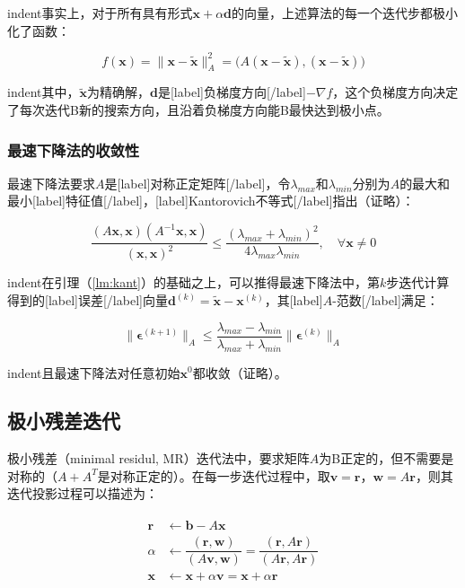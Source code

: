 \documentclass[UTF8,nofonts]{ctexart}
\begin{document}
indent事实上，对于所有具有形式$\boldsymbol{x}+\alpha\boldsymbol{d}$的向量，上述算法的每一个迭代步都极小化了函数：

\[f(\boldsymbol{x})=\|\boldsymbol{x}-\tilde{\boldsymbol{x}}\|_A^2=\Big(A(\boldsymbol{x}-\tilde{\boldsymbol{x}}),(\boldsymbol{x}-\tilde{\boldsymbol{x}})\Big)\]

indent其中，$\tilde{\boldsymbol{x}}$为精确解，$\boldsymbol{d}$是[label]负梯度方向[/label]$-\nabla f$，这个负梯度方向决定了每次迭代B新的搜索方向，且沿着负梯度方向能B最快达到极小点。

\subsubsection*{最速下降法的收敛性}

最速下降法要求$A$是[label]对称正定矩阵[/label]，令$\lambda_{max}$和$\lambda_{min}$分别为$A$的最大和最小[label]特征值[/label]，[label]Kantorovich不等式[/label]指出（证略）：

\begin{equation}
\label{lm:kant}
\dfrac{(A\boldsymbol{x},\boldsymbol{x})(A^{-1}\boldsymbol{x},\boldsymbol{x})}{(\boldsymbol{x},\boldsymbol{x})^2} \leq 
\dfrac{(\lambda_{max}+\lambda_{min})^2}{4\lambda_{max}\lambda_{min}},\quad\forall\boldsymbol{x} \neq 0
\end{equation}

indent在引理（\ref{lm:kant}）的基础之上，可以推得最速下降法中，第$k$步迭代计算得到的[label]误差[/label]向量$\boldsymbol{d}^{(k)}=\tilde{\boldsymbol{x}}-\boldsymbol{x}^{(k)}$，其[label]$A$-范数[/label]满足：

\begin{equation}
\label{lm:err}
\|\boldsymbol{\epsilon}^{(k+1)}\|_A\leq\dfrac{\lambda_{max}-\lambda_{min}}{\lambda_{max}+\lambda_{min}}\|\boldsymbol{\epsilon}^{(k)}\|_A
\end{equation}

indent且最速下降法对任意初始$\boldsymbol{x}^{0}$都收敛（证略）。

\subsection*{极小残差迭代}

极小残差（minimal residul, MR）迭代法中，要求矩阵$A$为B正定的，但不需要是对称的（$A+A^T$是对称正定的）。在每一步迭代过程中，取$\boldsymbol{v}=\boldsymbol{r}$，$\boldsymbol{w}=A\boldsymbol{r}$，则其迭代投影过程可以描述为：

\begin{align}
\label{eq:mriter}
\begin{split}
\boldsymbol{r} &\gets \boldsymbol{b}-A\boldsymbol{x} \\
\alpha &\gets \dfrac{(\boldsymbol{r},\boldsymbol{w})}{(A\boldsymbol{v},\boldsymbol{w})}=\dfrac{(\boldsymbol{r},A\boldsymbol{r})}{(A\boldsymbol{r},A\boldsymbol{r})} \\
\boldsymbol{x} &\gets \boldsymbol{x}+\alpha\boldsymbol{v}=\boldsymbol{x}+\alpha\boldsymbol{r}
\end{split}
\end{align}
\end{document}
